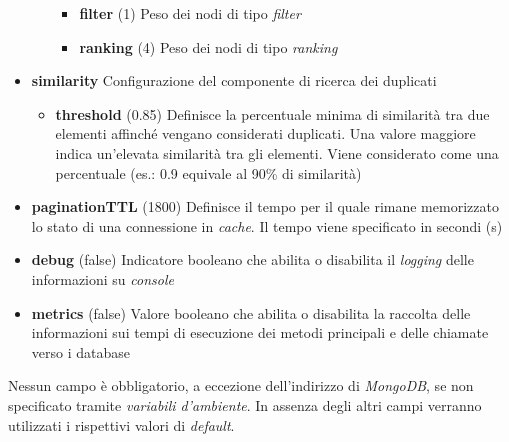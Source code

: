 \begin{itemize}
\begin{itemize}
\begin{itemize}
			\item \textbf{filter}
			(1) Peso dei nodi di tipo \emph{filter}
			\item \textbf{ranking}
			(4) Peso dei nodi di tipo \emph{ranking}
		\end{itemize}
	\end{itemize}
	\item \textbf{similarity}
	Configurazione del componente di ricerca dei duplicati
	\begin{itemize}
		\item \textbf{threshold}
		(0.85) Definisce la percentuale minima di similarità tra due elementi affinché vengano considerati duplicati. Una valore maggiore indica un'elevata similarità tra gli elementi. Viene considerato come una percentuale (es.: 0.9 equivale al 90\% di similarità)
	\end{itemize}
	\item \textbf{paginationTTL}
	(1800) Definisce il tempo per il quale rimane memorizzato lo stato di una connessione in \emph{cache}. Il tempo viene specificato in secondi (s)
	\item \textbf{debug}
	(false) Indicatore booleano che abilita o disabilita il \emph{logging} delle informazioni su \emph{console}
	\item \textbf{metrics}
	(false) Valore booleano che abilita o disabilita la raccolta delle informazioni sui tempi di esecuzione dei metodi principali e delle chiamate verso i database
\end{itemize}

Nessun campo è obbligatorio, a eccezione dell'indirizzo di \emph{MongoDB}, se non specificato tramite \emph{variabili d'ambiente}. In assenza degli altri campi verranno utilizzati i rispettivi valori di \emph{default}.